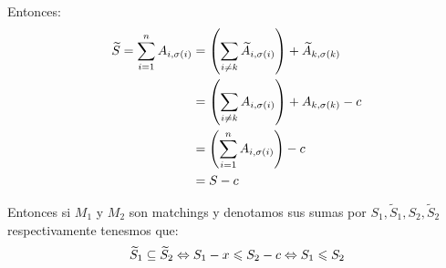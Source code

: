 \documentclass[12pt,a4paper]{article}
\begin{document}
Entonces:
\begin{align*}
    \widetilde{S} = \sum_{i=1}^{n} A_{i,\sigma(i)} &= \left(\sum_{i\neq k} \widetilde{A}_{i,\sigma(i)}\right) + \widetilde{A}_{k,\sigma(k)}\\
    &= \left(\sum_{i\neq k} A_{i,\sigma(i)}\right) + A_{k,\sigma(k)} - c\\
    &= \left(\sum_{i=1}^{n} A_{i,\sigma(i)}\right) - c\\
    &= S - c
\end{align*}

Entonces si $M_{1}$ y $M_{2}$ son matchings y denotamos sus sumas por $S_{1}, \widetilde{S}_{1}, S_{2}, \widetilde{S}_{2}$ 
respectivamente tenesmos que:
$$\widetilde{S}_{1} \subseteq \widetilde{S}_{2} \Leftrightarrow S_{1} - x \leqslant S_{2} - c \Leftrightarrow S_{1} \leqslant S_{2}$$
\end{document}
